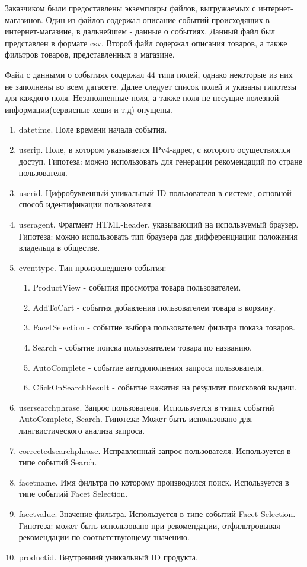 \documentclass[14pt]{mmcs_article}
\newenvironment{myenumerate}
{ \begin{enumerate}
		\setlength{\itemsep}{0pt}
		\setlength{\parskip}{0pt}
		\setlength{\parsep}{0pt}     }
	{ \end{enumerate}                  }
\begin{document}
Заказчиком были предоставлены экземпляры файлов, выгружаемых с интернет-магазинов.  
Один из файлов содержал описание событий происходящих в интернет-магазине, в дальнейшем - данные о событиях. Данный файл был представлен в формате csv. Второй файл содержал описания товаров, а также фильтров товаров, представленных в магазине. 

Файл с данными о событиях содержал 44 типа полей, однако некоторые из них не заполнены во всем датасете. Далее следует список полей и указаны гипотезы для каждого поля. Незаполненные поля, а также поля не несущие полезной информации(сервисные хеши и т.д) опущены.
\begin{myenumerate}
	\item datetime. Поле времени начала события. 
	\item userip. Поле, в котором указывается IPv4-адрес, с которого осуществлялся доступ. Гипотеза: можно использовать для генерации рекомендаций по стране пользователя.
	\item userid. Цифробуквенный уникальный ID пользователя в системе, основной способ идентификации пользователя.
	\item useragent. Фрагмент HTML-header, указывающий на используемый браузер. Гипотеза: можно использовать тип браузера для дифференциации положения владельца в обществе. 
	\item eventtype. Тип произошедшего события: 
	\begin{myenumerate}
		\item ProductView - события просмотра товара пользователем. 
		\item AddToCart - события добавления пользователем товара в корзину. 
		\item FacetSelection - событие выбора пользователем фильтра показа товаров.  
		\item Search - событие поиска пользователем товара по названию.
		\item AutoComplete - событие автодополнения запроса пользователя. 
		\item ClickOnSearchResult - событие нажатия на результат поисковой выдачи. 
	\end{myenumerate}
	\item usersearchphrase. Запрос пользователя. Используется в типах событий AutoComplete, Search. Гипотеза: Может быть использовано для лингвистического анализа запроса.
	\item correctedsearchphrase. Исправленный запрос пользователя. Используется в типе событий Search. 
	\item facetname. Имя фильтра по которому производился поиск. Используется в типе событий Facet Selection. 
	\item facetvalue. Значение фильтра. Используется в типе событий Facet Selection. Гипотеза: может быть использовано при рекомендации, отфильтровывая рекомендации по соответствующему значению. 
	\item productid. Внутренний уникальный ID продукта. 
\end{myenumerate}
\end{document}
